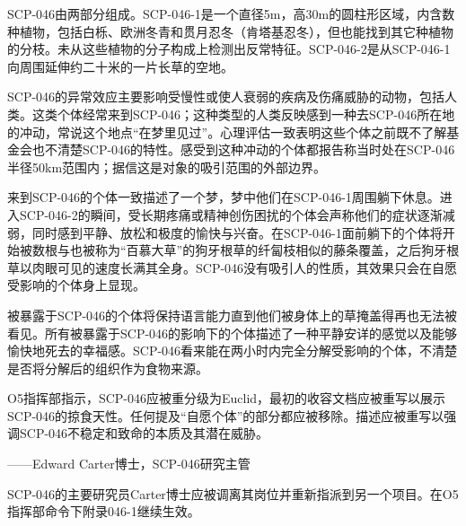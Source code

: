 SCP-046由两部分组成。SCP-046-1是一个直径5m，高30m的圆柱形区域，内含数种植物，包括白栎、欧洲冬青和贯月忍冬（肯塔基忍冬），但也能找到其它种植物的分枝。未从这些植物的分子构成上检测出反常特征。SCP-046-2是从SCP-046-1向周围延伸约二十米的一片长草的空地。

SCP-046的异常效应主要影响受慢性或使人衰弱的疾病及伤痛威胁的动物，包括人类。这类个体经常来到SCP-046；这种类型的人类反映感到一种去SCP-046所在地的冲动，常说这个地点“在梦里见过”。心理评估一致表明这些个体之前既不了解基金会也不清楚SCP-046的特性。感受到这种冲动的个体都报告称当时处在SCP-046半径50km范围内；据信这是对象的吸引范围的外部边界。

来到SCP-046的个体一致描述了一个梦，梦中他们在SCP-046-1周围躺下休息。进入SCP-046-2的瞬间，受长期疼痛或精神创伤困扰的个体会声称他们的症状逐渐减弱，同时感到平静、放松和极度的愉快与兴奋。在SCP-046-1面前躺下的个体将开始被数根与也被称为“百慕大草”的狗牙根草的纤匐枝相似的藤条覆盖，之后狗牙根草以肉眼可见的速度长满其全身。SCP-046没有吸引人的性质，其效果只会在自愿受影响的个体身上显现。

被暴露于SCP-046的个体将保持语言能力直到他们被身体上的草掩盖得再也无法被看见。所有被暴露于SCP-046的影响下的个体描述了一种平静安详的感觉以及能够愉快地死去的幸福感。SCP-046看来能在两小时内完全分解受影响的个体，不清楚是否将分解后的组织作为食物来源。

O5指挥部指示，SCP-046应被重分级为Euclid，最初的收容文档应被重写以展示SCP-046的掠食天性。任何提及“自愿个体”的部分都应被移除。描述应被重写以强调SCP-046不稳定和致命的本质及其潜在威胁。

——Edward Carter博士，SCP-046研究主管

SCP-046的主要研究员Carter博士应被调离其岗位并重新指派到另一个项目。在O5指挥部命令下附录046-1继续生效。

